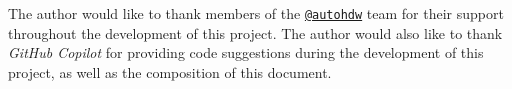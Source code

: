 The author would like to thank members of the \href{https://github.com/autohdw}{\texttt{@autohdw}} team for
their support throughout the development of this project.
The author would also like to thank \textit{GitHub Copilot}
for providing code suggestions during the development of this project,
as well as the composition of this document.
